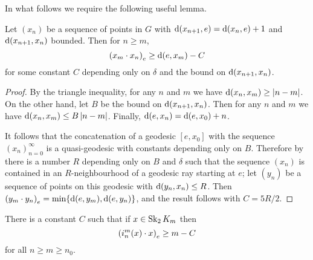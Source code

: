 \documentclass[a4paper]{article}
\begin{document}
In what follows we require the following useful lemma.

\begin{lemma}\label{lem:useful}
  Let $(x_n)$ be a sequence of points in $G$ with $\dist(x_{n+1}, e) = 
  \dist(x_n, e) + 1$ and $\dist(x_{n+1}, x_n)$ bounded. Then for $n \geq m$,
  \begin{equation*}
    \gromov{e}{x_m}{x_n} \geq \dist(e,x_m) - C
  \end{equation*}
  for some constant $C$ depending only on $\delta$ and the bound on 
  $\dist(x_{n+1}, x_n)$.
\end{lemma}

\begin{proof}
  By the triangle inequality, for any $n$ and $m$ we have $\dist(x_n, x_m) \geq
  \abs{n - m}$.  On the other hand, let $B$ be the bound on $\dist(x_{n+1},
  x_n)$. Then for any $n$ and $m$ we have $\dist(x_n, x_m) \leq B\abs{n - m}$. 
  Finally, $\dist(e, x_n) = \dist(e, x_0) + n$.
  
  It follows that the concatenation of a geodesic $[e, x_0]$ with the sequence
  $(x_n)_{n = 0}^\infty$ is a quasi-geodesic with constants depending only on
  $B$. Therefore by~\cite[Theorem III.H.1.7]{bridsonhaefliger99} there is a
  number $R$ depending only on $B$ and $\delta$ such that the sequence $(x_n)$
  is contained in an $R$-neighbourhood of a geodesic ray starting at $e$; let
  $(y_n)$ be a sequence of points on this geodesic with $\dist(y_n, x_n) \leq
  R$. Then $\gromov{e}{y_m}{y_n} = \min\{\dist(e, y_m), \dist(e, y_n)\}$, and
  the result follows with $C = 5R/2$.
\end{proof}

\begin{lemma}\label{lem:linearproduct}
  There is a constant $C$ such that if $x \in \Skel_2 K_m$ then
  \begin{equation*}
    \gromov{e}{i^m_n(x)}{x} \geq m - C
  \end{equation*}
  for all $n\geq m\geq n_0$.
\end{lemma}
\end{document}
